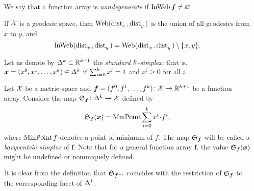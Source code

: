 We say that a function array is \emph{nondegenerate} 
if $\mathop{\rm InWeb}\nolimits\bm{f}\ne \varnothing$.

If $\mathcal{X}$ is a geodesic space, 
then $\mathop{\rm Web}\nolimits(\mathop{\rm dist}\nolimits_{x}^{{}}{}{},\mathop{\rm dist}\nolimits_{y}^{{}}{}{})$ is the union of all geodesics from $x$ to $y$, and 
\[\mathop{\rm InWeb}\nolimits(\mathop{\rm dist}\nolimits_{x}^{{}}{}{},\mathop{\rm dist}\nolimits_{y}^{{}}{}{})=\mathop{\rm Web}\nolimits(\mathop{\rm dist}\nolimits_{x}^{{}}{}{},\mathop{\rm dist}\nolimits_{y}^{{}}{}{})\setminus\{x,y\}.\]

Let us denote by $\Delta^\kay\subset \RR^{\kay+1}$ 
the \emph{standard $k$-simplex}; 
that is, $\bm{x}\z=(x^0,x^1,\dots,x^\kay)\in\Delta^\kay$ if $\sum_{i=0}^k x^i=1$ and $x^i\ge0$ for all $i$.

Let $\mathcal{X}$ be a metric space 
and $\bm{f}=(f^0,f^1,\dots,f^\kay)\:\spc{X}\to \RR^{\kay+1}$ be a function array.
Consider the map $\spx{\bm{f}}\:\Delta^\kay\to \spc{X}$ defined by 
\[\spx{\bm{f}}(\bm{x})=\argmin\sum_{i=0}^\kay x^i\cdot f^i,\]
where $\mathop{\rm MinPoint} f$ denotes a point of minimum of $f$.
The map $\mathfrak{S}_{\bm{f}}$ will be called a \emph{barycentric simplex} of $\bm{f}$.
Note that for a general function array $\bm{f}$, 
the value $\mathfrak{S}_{\bm{f}}(\bm{x})$ might be undefined or nonuniquely defined.

It is clear from the definition that $\mathfrak{S}_{\bm{f}^{{-} i}}$ 
coincides with the restriction of $\mathfrak{S}_{\bm{f}}$ to the corresponding facet of $\Delta^k$.


